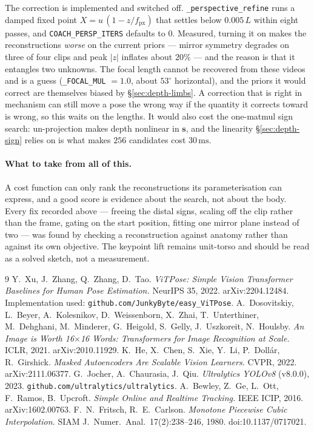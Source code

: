 \documentclass[10pt,a4paper]{article}
\newcommand{\Lt}{L}                      %
\begin{document}
The correction is implemented and switched off. \texttt{\_perspective\_refine}
runs a damped fixed point $X=u\,(1-z/f_{\text{px}})$ that settles below
$0.005\,\Lt$ within eight passes, and \texttt{COACH\_PERSP\_ITERS} defaults to
$0$. Measured, turning it on makes the reconstructions \emph{worse} on the
current priors --- mirror symmetry degrades on three of four clips and peak
$|z|$ inflates about $20\%$ --- and the reason is that it entangles two
unknowns. The focal length cannot be recovered from these videos and is a
guess (\texttt{\_FOCAL\_MUL} $=1.0$, about $53^\circ$ horizontal), and the
priors it would correct are themselves biased by \S\ref{sec:depth-limbs}. A
correction that is right in mechanism can still move a pose the wrong way if
the quantity it corrects toward is wrong, so this waits on the lengths. It
would also cost the one-matmul sign search: un-projection makes depth nonlinear
in $\mathbf{s}$, and the linearity \S\ref{sec:depth-sign} relies on is what
makes $256$ candidates cost $30\,\mathrm{ms}$.

\paragraph{What to take from all of this.} A cost function can only rank the
reconstructions its parameterisation can express, and a good score is evidence
about the search, not about the body. Every fix recorded above --- freeing the
distal signs, scaling off the clip rather than the frame, gating on the start
position, fitting one mirror plane instead of two --- was found by checking a
reconstruction against anatomy rather than against its own objective. The
keypoint lift remains unit-torso and should be read as a solved sketch, not a
measurement.

\begin{thebibliography}{9}\small
{} Y.~Xu, J.~Zhang, Q.~Zhang, D.~Tao. \emph{ViTPose: Simple Vision Transformer Baselines for Human Pose Estimation.} NeurIPS 35, 2022. arXiv:2204.12484. Implementation used: \texttt{github.com/JunkyByte/easy\_ViTPose}.
 A.~Dosovitskiy, L.~Beyer, A.~Kolesnikov, D.~Weissenborn, X.~Zhai, T.~Unterthiner, M.~Dehghani, M.~Minderer, G.~Heigold, S.~Gelly, J.~Uszkoreit, N.~Houlsby. \emph{An Image is Worth 16$\times$16 Words: Transformers for Image Recognition at Scale.} ICLR, 2021. arXiv:2010.11929.
 K.~He, X.~Chen, S.~Xie, Y.~Li, P.~Doll\'ar, R.~Girshick. \emph{Masked Autoencoders Are Scalable Vision Learners.} CVPR, 2022. arXiv:2111.06377.
 G.~Jocher, A.~Chaurasia, J.~Qiu. \emph{Ultralytics YOLOv8} (v8.0.0), 2023. \texttt{github.com/ultralytics/ultralytics}.
 A.~Bewley, Z.~Ge, L.~Ott, F.~Ramos, B.~Upcroft. \emph{Simple Online and Realtime Tracking.} IEEE ICIP, 2016. arXiv:1602.00763.
 F.~N.~Fritsch, R.~E.~Carlson. \emph{Monotone Piecewise Cubic Interpolation.} SIAM J.\ Numer.\ Anal.\ 17(2):238--246, 1980. doi:10.1137/0717021.
\end{thebibliography}
\end{document}
